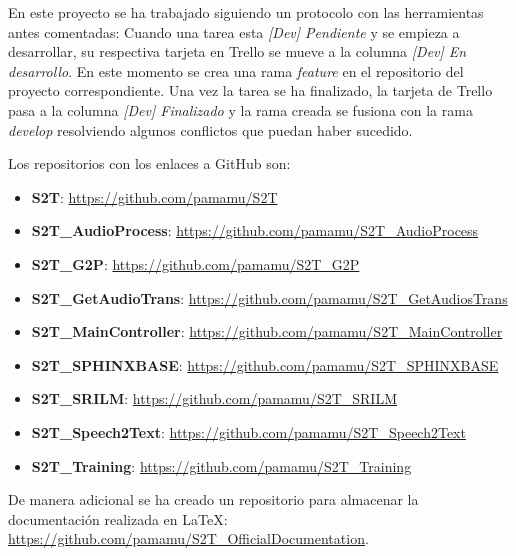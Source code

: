 \documentclass[../main.tex]{subfiles}
\begin{document}
En este proyecto se ha trabajado siguiendo un protocolo con las herramientas antes comentadas: Cuando una tarea esta \textit{[Dev] Pendiente} y se empieza a desarrollar, su respectiva tarjeta en Trello se mueve a la columna \textit{[Dev] En desarrollo}. En este momento se crea una rama \textit{feature} en el repositorio del proyecto correspondiente. Una vez la tarea se ha finalizado, la tarjeta de Trello pasa a la columna \textit{[Dev] Finalizado} y la rama creada se fusiona con la rama \textit{develop} resolviendo algunos conflictos que puedan haber sucedido.

Los repositorios con los enlaces a GitHub son:
\begin{itemize}
    \item \textbf{S2T}: \href{https://github.com/pamamu/S2T}{https://github.com/pamamu/S2T}
    \item \textbf{S2T\_AudioProcess}: \href{https://github.com/pamamu/S2T_AudioProcess}{https://github.com/pamamu/S2T\_AudioProcess}
    \item \textbf{S2T\_G2P}: \href{https://github.com/pamamu/S2T_G2P}{https://github.com/pamamu/S2T\_G2P}
    \item \textbf{S2T\_GetAudioTrans}: \href{https://github.com/pamamu/S2T_GetAudiosTrans}{https://github.com/pamamu/S2T\_GetAudiosTrans}
    \item \textbf{S2T\_MainController}: \href{https://github.com/pamamu/S2T_MainController}{https://github.com/pamamu/S2T\_MainController}
    \item \textbf{S2T\_SPHINXBASE}: \href{https://github.com/pamamu/S2T_SPHINXBASE}{https://github.com/pamamu/S2T\_SPHINXBASE}
    \item \textbf{S2T\_SRILM}: \href{https://github.com/pamamu/S2T_SRILM}{https://github.com/pamamu/S2T\_SRILM}
    \item \textbf{S2T\_Speech2Text}: \href{https://github.com/pamamu/S2T_Speech2Text}{https://github.com/pamamu/S2T\_Speech2Text}
    \item \textbf{S2T\_Training}: \href{https://github.com/pamamu/S2T_Training}{https://github.com/pamamu/S2T\_Training}
\end{itemize}

De manera adicional se ha creado un repositorio para almacenar la documentación realizada en \LaTeX: \href{https://github.com/pamamu/S2T_OfficialDocumentation}{https://github.com/pamamu/S2T\_OfficialDocumentation}.
\end{document}
